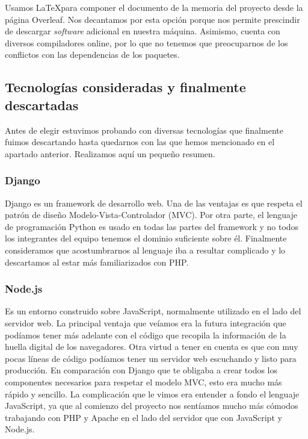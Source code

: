 Usamos \LaTeX para componer el documento de la memoria del proyecto desde la página Overleaf. Nos decantamos por esta opción porque nos permite prescindir de descargar \textit{software} adicional en nuestra máquina. Asimismo, cuenta con diversos compiladores online, por lo que no tenemos que preocuparnos de los conflictos con las dependencias de los paquetes. \par 

\subsection{Tecnologías consideradas y finalmente descartadas}
\label{subsec:rejected}
Antes de elegir estuvimos probando con diversas tecnologías que finalmente fuimos descartando hasta quedarnos con las que hemos mencionado en el apartado anterior. Realizamos aquí un pequeño resumen. \par 

\subsubsection{Django}
Django es un framework de desarrollo web. Una de las ventajas es que respeta el patrón de diseño Modelo-Vista-Controlador (MVC). Por otra parte, el lenguaje de programación Python es usado en todas las partes del framework y no todos los integrantes del equipo tenemos el dominio suficiente sobre él. Finalmente consideramos que acostumbrarnos al lenguaje iba a resultar complicado y lo descartamos al estar más familiarizados con PHP. \par 

\subsubsection{Node.js}
Es un entorno construido sobre JavaScript, normalmente utilizado en el lado del servidor web. La principal ventaja que veíamos era la futura integración que podíamos tener más adelante con el código que recopila la información de la huella digital de los navegadores. Otra virtud a tener en cuenta es que con muy pocas líneas de código podíamos tener un servidor web escuchando y listo para producción. En comparación con Django que te obligaba a crear todos los componentes necesarios para respetar el modelo MVC, esto era mucho más rápido y sencillo. La complicación que le vimos era entender a fondo el lenguaje JavaScript, ya que al comienzo del proyecto nos sentíamos mucho más cómodos trabajando con PHP y Apache en el lado del servidor que con JavaScript y Node.js. \par 

